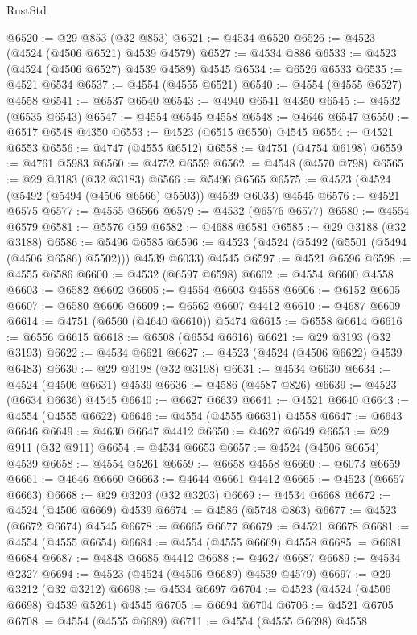 \begin{lexlean}{RustStd}
\begin{coremodule}
@6520 := @29 @853 (@32 @853)
@6521 := @4534 @6520
@6526 := @4523 (@4524 (@4506 @6521) @4539 @4579)
@6527 := @4534 @886
@6533 := @4523 (@4524 (@4506 @6527) @4539 @4589) @4545
@6534 := @6526 @6533
@6535 := @4521 @6534
@6537 := @4554 (@4555 @6521)
@6540 := @4554 (@4555 @6527) @4558
@6541 := @6537 @6540
@6543 := @4940 @6541 @4350
@6545 := @4532 (@6535 @6543)
@6547 := @4554 @6545 @4558
@6548 := @4646 @6547
@6550 := @6517 @6548 @4350
@6553 := @4523 (@6515 @6550) @4545
@6554 := @4521 @6553
@6556 := @4747 (@4555 @6512)
@6558 := @4751 (@4754 @6198)
@6559 := @4761 @5983
@6560 := @4752 @6559
@6562 := @4548 (@4570 @798)
@6565 := @29 @3183 (@32 @3183)
@6566 := @5496 @6565
@6575 := @4523 (@4524 (@5492 (@5494 (@4506 @6566) @5503)) @4539 @6033) @4545
@6576 := @4521 @6575
@6577 := @4555 @6566
@6579 := @4532 (@6576 @6577)
@6580 := @4554 @6579
@6581 := @5576 @59
@6582 := @4688 @6581
@6585 := @29 @3188 (@32 @3188)
@6586 := @5496 @6585
@6596 := @4523 (@4524 (@5492 (@5501 (@5494 (@4506 @6586) @5502))) @4539 @6033) @4545
@6597 := @4521 @6596
@6598 := @4555 @6586
@6600 := @4532 (@6597 @6598)
@6602 := @4554 @6600 @4558
@6603 := @6582 @6602
@6605 := @4554 @6603 @4558
@6606 := @6152 @6605
@6607 := @6580 @6606
@6609 := @6562 @6607 @4412
@6610 := @4687 @6609
@6614 := @4751 (@6560 (@4640 @6610)) @5474
@6615 := @6558 @6614
@6616 := @6556 @6615
@6618 := @6508 (@6554 @6616)
@6621 := @29 @3193 (@32 @3193)
@6622 := @4534 @6621
@6627 := @4523 (@4524 (@4506 @6622) @4539 @6483)
@6630 := @29 @3198 (@32 @3198)
@6631 := @4534 @6630
@6634 := @4524 (@4506 @6631) @4539
@6636 := @4586 (@4587 @826)
@6639 := @4523 (@6634 @6636) @4545
@6640 := @6627 @6639
@6641 := @4521 @6640
@6643 := @4554 (@4555 @6622)
@6646 := @4554 (@4555 @6631) @4558
@6647 := @6643 @6646
@6649 := @4630 @6647 @4412
@6650 := @4627 @6649
@6653 := @29 @911 (@32 @911)
@6654 := @4534 @6653
@6657 := @4524 (@4506 @6654) @4539
@6658 := @4554 @5261
@6659 := @6658 @4558
@6660 := @6073 @6659
@6661 := @4646 @6660
@6663 := @4644 @6661 @4412
@6665 := @4523 (@6657 @6663)
@6668 := @29 @3203 (@32 @3203)
@6669 := @4534 @6668
@6672 := @4524 (@4506 @6669) @4539
@6674 := @4586 (@5748 @863)
@6677 := @4523 (@6672 @6674) @4545
@6678 := @6665 @6677
@6679 := @4521 @6678
@6681 := @4554 (@4555 @6654)
@6684 := @4554 (@4555 @6669) @4558
@6685 := @6681 @6684
@6687 := @4848 @6685 @4412
@6688 := @4627 @6687
@6689 := @4534 @2327
@6694 := @4523 (@4524 (@4506 @6689) @4539 @4579)
@6697 := @29 @3212 (@32 @3212)
@6698 := @4534 @6697
@6704 := @4523 (@4524 (@4506 @6698) @4539 @5261) @4545
@6705 := @6694 @6704
@6706 := @4521 @6705
@6708 := @4554 (@4555 @6689)
@6711 := @4554 (@4555 @6698) @4558

\end{coremodule}
\end{lexlean}
